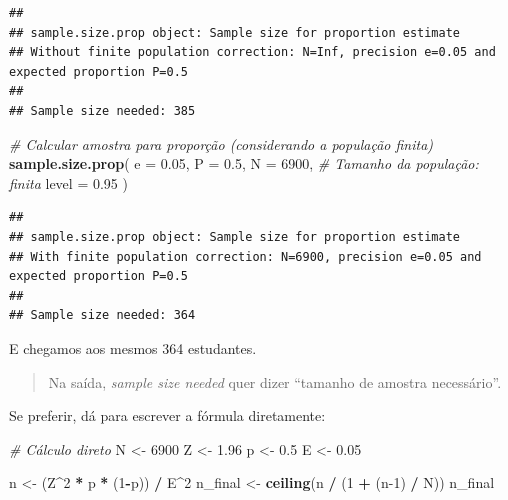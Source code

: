 \documentclass[
]{book}
\newenvironment{Shaded}{\begin{snugshade}}{\end{snugshade}}
\newcommand{\AttributeTok}[1]{\textcolor[rgb]{0.13,0.29,0.53}{#1}}
\newcommand{\CommentTok}[1]{\textcolor[rgb]{0.56,0.35,0.01}{\textit{#1}}}
\newcommand{\DecValTok}[1]{\textcolor[rgb]{0.00,0.00,0.81}{#1}}
\newcommand{\FloatTok}[1]{\textcolor[rgb]{0.00,0.00,0.81}{#1}}
\newcommand{\FunctionTok}[1]{\textcolor[rgb]{0.13,0.29,0.53}{\textbf{#1}}}
\newcommand{\NormalTok}[1]{#1}
\newcommand{\OtherTok}[1]{\textcolor[rgb]{0.56,0.35,0.01}{#1}}
\newcommand{\SpecialCharTok}[1]{\textcolor[rgb]{0.81,0.36,0.00}{\textbf{#1}}}
\begin{document}
\begin{verbatim}
## 
## sample.size.prop object: Sample size for proportion estimate
## Without finite population correction: N=Inf, precision e=0.05 and expected proportion P=0.5
## 
## Sample size needed: 385
\end{verbatim}

\begin{Shaded}
\begin{Highlighting}[]
\CommentTok{\# Calcular amostra para proporção (considerando a população finita)}
\FunctionTok{sample.size.prop}\NormalTok{(}
  \AttributeTok{e =} \FloatTok{0.05}\NormalTok{, }
  \AttributeTok{P =} \FloatTok{0.5}\NormalTok{, }
  \AttributeTok{N =} \DecValTok{6900}\NormalTok{,           }\CommentTok{\# Tamanho da população: finita }
  \AttributeTok{level =} \FloatTok{0.95}
\NormalTok{  )}
\end{Highlighting}
\end{Shaded}

\begin{verbatim}
## 
## sample.size.prop object: Sample size for proportion estimate
## With finite population correction: N=6900, precision e=0.05 and expected proportion P=0.5
## 
## Sample size needed: 364
\end{verbatim}

E chegamos aos mesmos 364 estudantes.

\begin{quote}
Na saída, \emph{sample size needed} quer dizer ``tamanho de amostra necessário''.
\end{quote}

Se preferir, dá para escrever a fórmula diretamente:

\begin{Shaded}
\begin{Highlighting}[]
\CommentTok{\# Cálculo direto}
\NormalTok{N }\OtherTok{\textless{}{-}} \DecValTok{6900}
\NormalTok{Z }\OtherTok{\textless{}{-}} \FloatTok{1.96}
\NormalTok{p }\OtherTok{\textless{}{-}} \FloatTok{0.5}
\NormalTok{E }\OtherTok{\textless{}{-}} \FloatTok{0.05}

\NormalTok{n }\OtherTok{\textless{}{-}}\NormalTok{ (Z}\SpecialCharTok{\^{}}\DecValTok{2} \SpecialCharTok{*}\NormalTok{ p }\SpecialCharTok{*}\NormalTok{ (}\DecValTok{1}\SpecialCharTok{{-}}\NormalTok{p)) }\SpecialCharTok{/}\NormalTok{ E}\SpecialCharTok{\^{}}\DecValTok{2}
\NormalTok{n\_final }\OtherTok{\textless{}{-}} \FunctionTok{ceiling}\NormalTok{(n }\SpecialCharTok{/}\NormalTok{ (}\DecValTok{1} \SpecialCharTok{+}\NormalTok{ (n}\DecValTok{{-}1}\NormalTok{) }\SpecialCharTok{/}\NormalTok{ N))}
\NormalTok{n\_final}
\end{Highlighting}
\end{Shaded}
\end{document}

